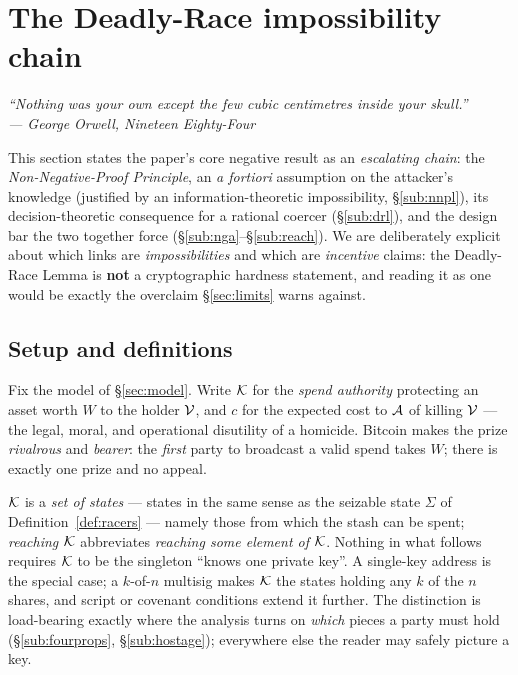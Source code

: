 \section{The Deadly-Race impossibility chain}
\label{sec:chain}

\begin{flushright}
\itshape ``Nothing was your own except the few cubic centimetres inside your
skull.''\\
\upshape\footnotesize --- George Orwell, \emph{Nineteen Eighty-Four}
\end{flushright}

\noindent This section states the paper's core negative result as an \emph{escalating
chain}: the \emph{Non-Negative-Proof Principle}, an \emph{a fortiori} assumption on
the attacker's knowledge (justified by an information-theoretic impossibility, \S\ref{sub:nnpl}), its decision-theoretic
consequence for a rational coercer (\S\ref{sub:drl}), and the design bar the two
together force (\S\ref{sub:nga}--\S\ref{sub:reach}). We are
deliberately explicit about which links are \emph{impossibilities} and which are
\emph{incentive} claims: the Deadly-Race Lemma is \textbf{not} a cryptographic
hardness statement, and reading it as one would be exactly the overclaim
\S\ref{sec:limits} warns against.

\subsection{Setup and definitions}
\label{sub:setup}

Fix the model of \S\ref{sec:model}. Write $\mathcal{K}$ for the \emph{spend authority}
protecting an asset worth $W$ to the holder $\mathcal{V}$, and $c$ for
the expected cost to $\mathcal{A}$ of killing $\mathcal{V}$ --- the legal, moral, and
operational disutility of a homicide. Bitcoin makes the prize \emph{rivalrous}
and \emph{bearer}: the \emph{first} party to broadcast a valid spend takes $W$;
there is exactly one prize and no appeal.

$\mathcal{K}$ is a \emph{set of states} --- states in the same sense as the seizable
state $\Sigma$ of Definition~\ref{def:racers} --- namely those from which the
stash can be spent; \emph{reaching $\mathcal{K}$} abbreviates \emph{reaching some
element of $\mathcal{K}$}. Nothing in what follows requires $\mathcal{K}$ to be the singleton
``knows one private key''. A single-key address is the special case; a $k$-of-$n$
multisig makes $\mathcal{K}$ the states holding any $k$ of the $n$ shares, and script or
covenant conditions extend it further. The distinction is load-bearing exactly
where the analysis turns on \emph{which} pieces a party must hold
(\S\ref{sub:fourprops}, \S\ref{sub:hostage}); everywhere else the reader may
safely picture a key.

